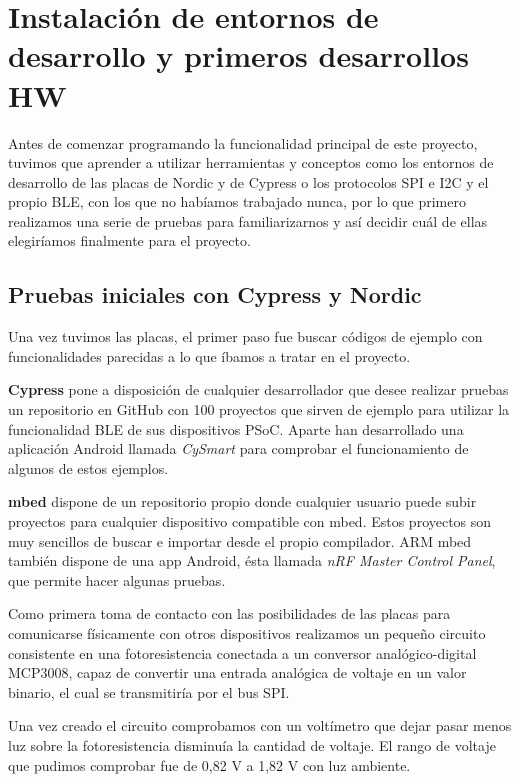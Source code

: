 
\cleardoublepage

\chapter{Instalación de entornos de desarrollo y primeros desarrollos HW}
\label{makereference4}

Antes de comenzar programando la funcionalidad principal de este proyecto, tuvimos que aprender a utilizar herramientas y conceptos como los entornos de desarrollo de las placas de Nordic y de Cypress o los protocolos SPI e I2C y el propio BLE, con los que no habíamos trabajado nunca, por lo que primero realizamos una serie de pruebas para familiarizarnos y así decidir cuál de ellas elegiríamos finalmente para el proyecto.

\section{Pruebas iniciales con Cypress y Nordic}
\label{makereference4.1}

Una vez tuvimos las placas, el primer paso fue buscar códigos de ejemplo con funcionalidades parecidas a lo que íbamos a tratar en el proyecto.

\textbf{Cypress} pone a disposición de cualquier desarrollador que desee realizar pruebas un repositorio en GitHub con 100 proyectos que sirven de ejemplo para utilizar la funcionalidad BLE de sus dispositivos PSoC. Aparte han desarrollado una aplicación Android llamada \textit{CySmart} para comprobar el funcionamiento de algunos de estos ejemplos.

\textbf{mbed} dispone de un repositorio propio donde cualquier usuario puede subir proyectos para cualquier dispositivo compatible con mbed. Estos proyectos son muy sencillos de buscar e importar desde el propio compilador. ARM mbed también dispone de una app Android, ésta llamada \textit{nRF Master Control Panel}, que permite hacer algunas pruebas.

Como primera toma de contacto con las posibilidades de las placas para comunicarse físicamente con otros dispositivos realizamos un pequeño circuito consistente en una fotoresistencia conectada a un conversor analógico-digital MCP3008, capaz de convertir una entrada analógica de voltaje en un valor binario, el cual se transmitiría por el bus SPI.

Una vez creado el circuito comprobamos con un voltímetro que dejar pasar menos luz sobre la fotoresistencia disminuía la cantidad de voltaje. El rango de voltaje que pudimos comprobar fue de 0,82 V a 1,82 V con luz ambiente.

